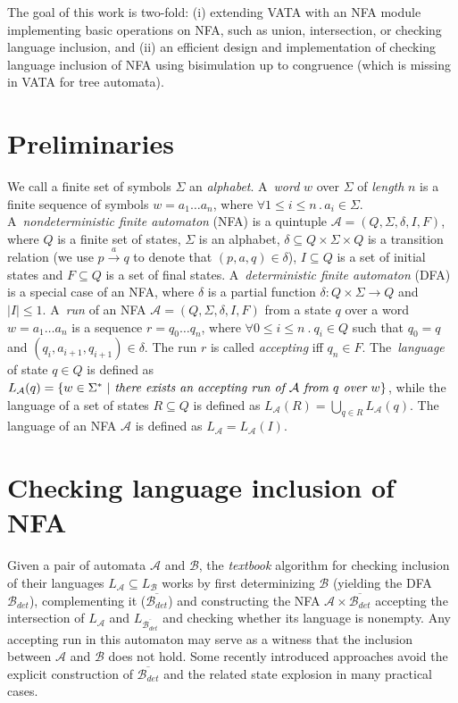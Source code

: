 \documentclass{eeict}
\begin{document}
The goal of this work is two-fold: (i) extending VATA with an NFA module implementing basic operations on NFA, such as union, intersection, or 
checking language inclusion, and (ii) an efficient design and implementation of checking language inclusion of NFA using 
bisimulation up to congruence (which is missing in VATA for tree automata).

\section{Preliminaries}
We call a finite set of symbols $\Sigma$ an \emph{alphabet}. A~\emph{word} $w$ over $\Sigma$ of \emph{length} $n$ is a finite sequence of symbols 
$w=a_1\ldots a_n$, where $\forall 1 \leq i \leq n\,.\,a_i \in \Sigma$. 
A~\emph{nondeterministic finite automaton} (NFA) is a quintuple $\mathcal{A}= (Q,\Sigma,\delta,I,F)$, 
where $Q$ is a finite set of states, $\Sigma$ is an alphabet, $\delta \subseteq Q\times \Sigma \times Q$
is a transition relation (we use $p \xrightarrow{a} q$ to denote that $(p,a,q) \in \delta$), $I \subseteq Q$ is a set of initial states 
and $F \subseteq Q$ is a set of final states. A~\emph{deterministic finite automaton} (DFA) is a special case of an NFA, 
where $\delta$ is a partial function 
$\delta: Q\times \Sigma \to Q$ and $|I| \leq 1$. A~\emph{run} of an NFA $\mathcal{A}=(Q,\Sigma,\delta,I,F)$ from a state $q$
over a word $w=a_1\ldots a_n$ is a sequence $r = q_0 \ldots q_n$, where $\forall 0\leq i \leq n\ .\ q_i\in Q$ 
such that $q_0=q$ and $(q_i,a_{i+1},q_{i+1})\in \delta$. 
The run $r$ is called \emph{accepting} iff $q_n \in F$. The~\emph{language} of state $q \in Q$ is defined as 
$L_\mathcal{A}(q) = \{w\in \Sigma^{*}\ |\ \emph{there exists an accepting run of }\mathcal{A} 
\emph{ from }q\emph{ over }w\}$, while the language of a set of states $R\subseteq Q$ is defined as $L_{\mathcal{A}}(R)=\bigcup_{q\in R}L_{\mathcal{A}}(q)$.
The language of an NFA $\mathcal{A}$ is defined as $L_{\mathcal{A}}=L_{\mathcal{A}}(I)$.

\section{Checking language inclusion of NFA}
Given a pair of automata $\mathcal{A}$ and $\mathcal{B}$,
the \emph{textbook} algorithm for checking inclusion of their languages $L_\mathcal{A}\subseteq L_\mathcal{B}$ works by first 
determinizing $\mathcal{B}$ (yielding the DFA 
$\mathcal{B}_{det}$), 
complementing it ($\overline{\mathcal{B}_{det}}$) and constructing the NFA $\mathcal{A} \times \overline{\mathcal{B}_{det}}$ 
accepting the intersection of $L_{\mathcal{A}}$ and ${L_{\overline{\mathcal{B}_{det}}}}$ and
checking whether its language is nonempty. Any accepting run in this automaton may serve as a witness that the inclusion between $\mathcal{A}$ 
and $\mathcal{B}$ does not hold. 
Some recently introduced approaches avoid the explicit construction of $\overline{\mathcal{B}_{det}}$ and the related state explosion in many practical cases.
\end{document}
